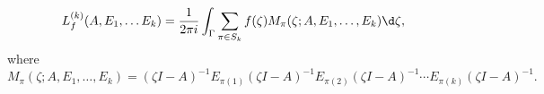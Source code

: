 \begin{equation}\label{eq:integral_representation}
L_f^{(k)}(A, E_1, \dots E_k) = \frac{1}{2\pi i} \int_\Gamma \sum\limits_{\pi \in S_k} f(\zeta) M_\pi(\zeta; A, E_1,\dots, E_k) \d \zeta,
\end{equation}
where 
\begin{equation}\label{eq:integrand_M}
M_\pi(\zeta; A, E_1,\dots, E_k) = (\zeta I - A)^{-1}E_{\pi(1)}(\zeta I - A)^{-1}E_{\pi(2)}(\zeta I - A)^{-1}\cdots E_{\pi(k)}(\zeta I - A)^{-1}.
\end{equation}
